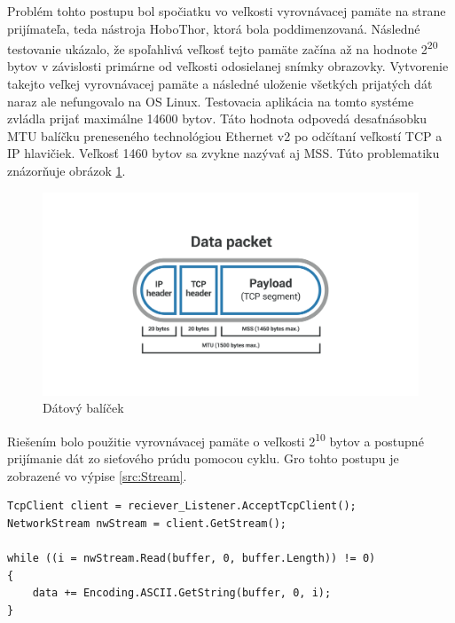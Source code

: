 \documentclass[slovak, bachelorpractice]{diploma}
\begin{document}
Problém tohto postupu bol spočiatku vo veľkosti vyrovnávacej pamäte na strane prijímateľa, teda nástroja HoboThor, ktorá bola poddimenzovaná. Následné testovanie ukázalo, že spoľahlivá veľkosť tejto pamäte začína až na hodnote 2\textsuperscript{20} bytov v závislosti primárne od veľkosti odosielanej snímky obrazovky. Vytvorenie takejto veľkej vyrovnávacej pamäte a následné uloženie všetkých prijatých dát naraz ale nefungovalo na OS Linux. Testovacia aplikácia na tomto systéme zvládla prijať maximálne 14600 bytov. Táto hodnota odpovedá desaťnásobku MTU balíčku preneseného technológiou Ethernet v2 po odčítaní veľkostí TCP a IP hlavičiek. Veľkosť 1460 bytov sa zvykne nazývať aj MSS. Túto problematiku znázorňuje obrázok \ref{pic:Packet}.
\vspace{-50pt}
\begin{figure}[!htbp]
	\centering
	\includegraphics[width=1\textwidth]{Pictures/packet.png}
	\vspace{-60pt}
	\caption{Dátový balíček \cite{MSS}}
	\label{pic:Packet}
\end{figure}

Riešením bolo použitie vyrovnávacej pamäte o veľkosti 2\textsuperscript{10} bytov a postupné prijímanie dát zo sieťového prúdu pomocou cyklu. Gro tohto postupu je zobrazené vo výpise \ref{src:Stream}.
\vspace{10pt}
\begin{lstlisting}[label=src:Stream,caption={Postupné čítanie dát zo sieťového prúdu}]
TcpClient client = reciever_Listener.AcceptTcpClient();
NetworkStream nwStream = client.GetStream();

while ((i = nwStream.Read(buffer, 0, buffer.Length)) != 0)
{
    data += Encoding.ASCII.GetString(buffer, 0, i);
}
\end{lstlisting}
\vspace{5pt}
\end{document}
